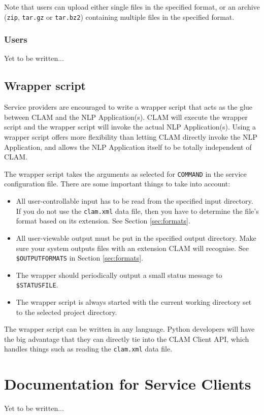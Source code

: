 \documentclass[a4paper,12pt]{report}
\begin{document}
Note that users can upload either single files in the specified format, or an archive (\texttt{zip}, \texttt{tar.gz} or \texttt{tar.bz2}) containing multiple files in the specified format. 

\subsection{Users}

Yet to be written... %

\section{Wrapper script}

Service providers are encouraged to write a wrapper script that acts as the glue between CLAM and the NLP Application(s). CLAM will execute the wrapper script and the wrapper script will invoke the actual NLP Application(s). Using a wrapper script offers more flexibility than letting CLAM directly invoke the NLP Application, and allows the NLP Application itself to be totally independent of CLAM. 

The wrapper script takes the arguments as selected for \texttt{COMMAND} in the service configuration file. There are some important things to take into account:

\begin{itemize}
\item All user-controllable input has to be read from the specified input directory. If you do not use the \texttt{clam.xml} data file, then you have to determine the file's format based on its extension. See Section \ref{sec:formats}.
\item All user-viewable output must be put in the specified output directory. Make sure your system outputs files with an extension CLAM will recognise. See \texttt{\$OUTPUTFORMATS} in Section \ref{sec:formats}.
\item The wrapper should periodically output a small status message to \texttt{\$STATUSFILE}. 
\item The wrapper script is always started with the current working directory set to the selected project directory.
\end{itemize}

The wrapper script can be written in any language. Python developers will have the big advantage that they can directly tie into the CLAM Client API, which handles things such as reading the \texttt{clam.xml} data file.

\chapter{Documentation for Service Clients}

Yet to be written... %



\end{document}
